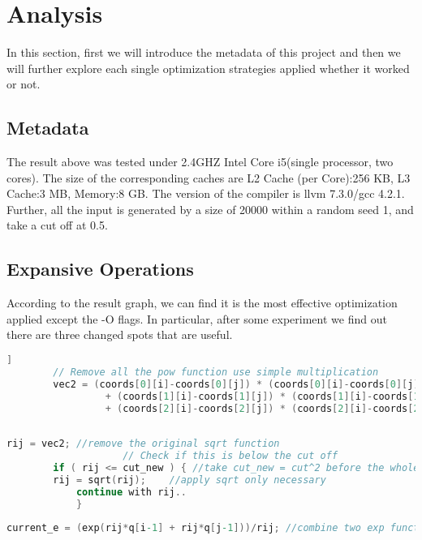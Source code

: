 \documentclass{cs4444}
\begin{document}
\normalsize
\section{Analysis}
In this section, first we will introduce the metadata of this project and then we will further explore each single optimization strategies applied whether it worked or not.

\subsection{Metadata}
The result above was tested under 2.4GHZ Intel Core i5(single processor, two cores). The size of the corresponding caches are L2 Cache (per Core):256 KB, L3 Cache:3 MB, Memory:8 GB. The version of the compiler is llvm 7.3.0/gcc 4.2.1. Further, all the input is generated by a size of 20000 within a random seed 1, and take a cut off at 0.5.

\subsection{Expansive Operations}
According to the result graph, we can find it is the most effective optimization applied except the -O flags. In particular, after some experiment we find out there are three changed spots that are useful. 
	 \begin{lstlisting}[language=C]]
	 	// Remove all the pow function use simple multiplication
	 	vec2 = (coords[0][i]-coords[0][j]) * (coords[0][i]-coords[0][j])
                 + (coords[1][i]-coords[1][j]) * (coords[1][i]-coords[1][j])
                 + (coords[2][i]-coords[2][j]) * (coords[2][i]-coords[2][j]);
 
	 \end{lstlisting}
	 
	 \begin{lstlisting}[language=C] 
		rij = vec2; //remove the original sqrt function
       			    // Check if this is below the cut off
        if ( rij <= cut_new ) { //take cut_new = cut^2 before the whole computation process
        rij = sqrt(rij);    //apply sqrt only necessary
            continue with rij..
            }
	 \end{lstlisting}
	 
	 \begin{lstlisting}[language=C] 
	 	current_e = (exp(rij*q[i-1] + rij*q[j-1]))/rij; //combine two exp function into one  
	 	
	 \end{lstlisting}
	 
\end{document}

